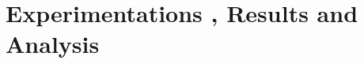 \chapter{Experimentations , Results and Analysis}

\ifpdf
    \graphicspath{{Chapter4/Figs/Raster/}{Chapter4/Figs/PDF/}{Chapter4/Figs/}}
\else
    \graphicspath{{Chapter4/Figs/Vector/}{Chapter4/Figs/}}
\fi
